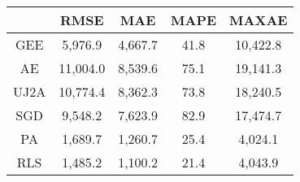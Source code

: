 \begin{tabular}{ccccc}
\toprule
{} &      RMSE &      MAE &  MAPE &     MAXAE \\
\midrule
GEE  &   5,976.9 &  4,667.7 &  41.8 &  10,422.8 \\
AE   &  11,004.0 &  8,539.6 &  75.1 &  19,141.3 \\
UJ2A &  10,774.4 &  8,362.3 &  73.8 &  18,240.5 \\
SGD  &   9,548.2 &  7,623.9 &  82.9 &  17,474.7 \\
PA   &   1,689.7 &  1,260.7 &  25.4 &   4,024.1 \\
RLS  &   1,485.2 &  1,100.2 &  21.4 &   4,043.9 \\
\bottomrule
\end{tabular}
